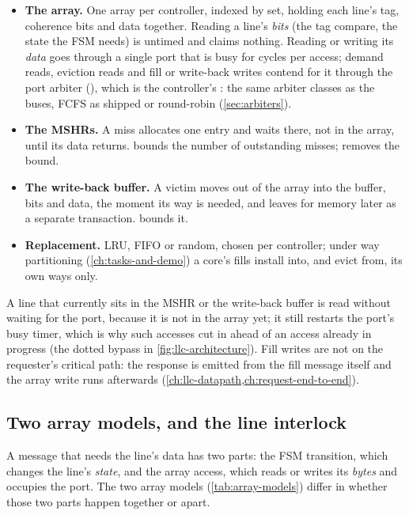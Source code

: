 \begin{itemize}
\item \textbf{The array.} One array per controller, indexed by set, holding each line's tag,
  coherence bits and data together. Reading a line's \emph{bits} (the tag compare, the state
  the FSM needs) is untimed and claims nothing. Reading or writing its \emph{data} goes through a
  single port that is busy for  cycles per access; demand
  reads, eviction reads and fill or write-back writes contend for it through the port arbiter
  (), which is the controller's : the same
  arbiter classes as the buses, FCFS as shipped or round-robin (\cref{sec:arbiters}).
\item \textbf{The MSHRs.} A miss allocates one entry and waits there, not in the array, until
  its data returns.  bounds the number of outstanding misses;  removes
  the bound.
\item \textbf{The write-back buffer.} A victim moves out of the array into the buffer, bits and
  data, the moment its way is needed, and leaves for memory later as a separate transaction.
   bounds it.
\item \textbf{Replacement.} LRU, FIFO or random, chosen per controller; under way partitioning
  (\cref{ch:tasks-and-demo}) a core's fills install into, and evict from, its own ways only.
\end{itemize}

A line that currently sits in the MSHR or the write-back buffer is read without waiting for the
port, because it is not in the array yet; it still restarts the port's busy timer, which is why
such accesses cut in ahead of an access already in progress (the dotted bypass in
\cref{fig:llc-architecture}). Fill writes are not on the requester's critical path: the
response is emitted from the fill message itself and the array write runs afterwards
(\cref{ch:llc-datapath,ch:request-end-to-end}).

\subsection{Two array models, and the line interlock}

A message that needs the line's data has two parts: the FSM transition, which changes the
line's \emph{state}, and the array access, which reads or writes its \emph{bytes} and occupies the
port. The two array models (\cref{tab:array-models}) differ in whether those two parts happen
together or apart.

